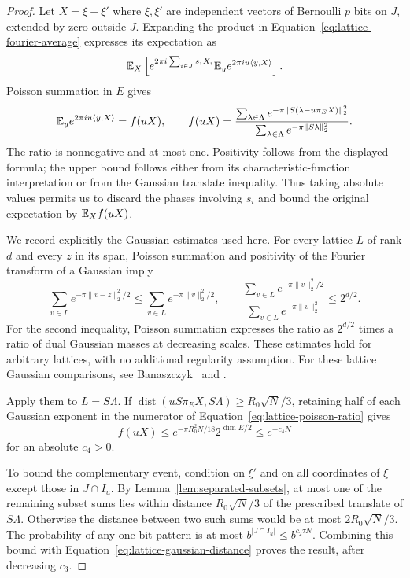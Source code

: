\begin{proof}
Let $X=\xi-\xi'$ where $\xi,\xi'$ are independent vectors of
Bernoulli $p$ bits on $J$, extended by zero outside $J$.
Expanding the product in Equation~\eqref{eq:lattice-fourier-average}
expresses its expectation as
\[
 \mathbb E_X\left[e^{2\pi i\sum_{i\in J}s_iX_i}
                  \mathbb E_y e^{2\pi i u\langle y,X\rangle}\right].
\]
Poisson summation in $E$ gives
\begin{equation}\label{eq:lattice-poisson-ratio}
 \mathbb E_y e^{2\pi i u\langle y,X\rangle}=f(uX),\qquad
 f(uX)=
 \frac{\sum_{\lambda\in\Lambda}
       e^{-\pi\lVert S(\lambda-u\pi_EX)\rVert_2^2}}
      {\sum_{\lambda\in\Lambda}e^{-\pi\lVert S\lambda\rVert_2^2}}.
\end{equation}
The ratio is nonnegative and at most one.  Positivity follows from
the displayed formula; the upper bound follows either from its
characteristic-function interpretation or from the Gaussian
translate inequality.  Thus taking absolute values permits us to
discard the phases involving $s_i$ and bound the original expectation
by $\mathbb E_X f(uX)$.

We record explicitly the Gaussian estimates used here.  For every
lattice $L$ of rank $d$ and every $z$ in its span, Poisson summation
and positivity of the Fourier transform of a Gaussian imply
\[
 \sum_{v\in L}e^{-\pi\lVert v-z\rVert_2^2/2}
 \le\sum_{v\in L}e^{-\pi\lVert v\rVert_2^2/2},
 \qquad
 \frac{\sum_{v\in L}e^{-\pi\lVert v\rVert_2^2/2}}
      {\sum_{v\in L}e^{-\pi\lVert v\rVert_2^2}}
 \le 2^{d/2}.
\]
For the second inequality, Poisson summation expresses the ratio as
$2^{d/2}$ times a ratio of dual Gaussian masses at decreasing scales.
These estimates hold for arbitrary lattices, with no additional
regularity assumption.  For these lattice Gaussian comparisons, see
Banaszczyk~\cite{Banaszczyk} and
\cite[Equation (5) and Claim 2.2]{ReverseMinkowski}.

Apply them to $L=S\Lambda$.  If
$\operatorname{dist}(uS\pi_EX,S\Lambda)\ge R_0\sqrt N/3$, retaining
half of each Gaussian exponent in the numerator of
Equation~\eqref{eq:lattice-poisson-ratio} gives
\begin{equation}\label{eq:lattice-gaussian-distance}
 f(uX)\le e^{-\pi R_0^2N/18}2^{\dim E/2}
          \le e^{-c_4N}
\end{equation}
for an absolute $c_4>0$.

To bound the complementary event, condition on $\xi'$ and on all
coordinates of $\xi$ except those in $J\cap I_u$.
By Lemma~\ref{lem:separated-subsets}, at most one of the remaining
subset sums lies within distance $R_0\sqrt N/3$ of the prescribed
translate of $S\Lambda$.  Otherwise the distance between two such
sums would be at most $2R_0\sqrt N/3$.
The probability of any one bit pattern is at most
$b^{|J\cap I_u|}\le b^{c_2\tau N}$.  Combining this bound with
Equation~\eqref{eq:lattice-gaussian-distance} proves the result,
after decreasing $c_3$.
\end{proof}

